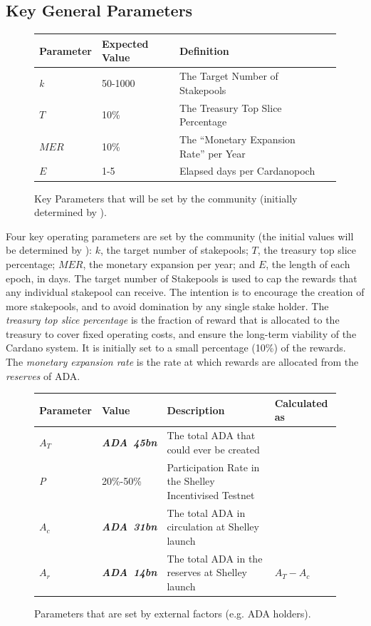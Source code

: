 \documentclass[11pt,a4paper,dvipsnames,twosided]{article}
\newcommand{\ada}{ADA{}}
\newcommand{\ADA}[1]{\textbf{\emph{\ada~{#1}}}}
\newcommand{\cardano}[1]{Cardano}
\begin{document}
\newpage
\subsection{Key General Parameters}

\begin{figure}[h!]
\begin{center}
\begin{tabular}{||l|l|p{6cm}|l||}
  \hline \hline
\textbf{Parameter} & \textbf{Expected Value} & \textbf{Definition} \\\hline
\emph{k} & 50-1000 & The Target Number of Stakepools \\\hline
$T$ & 10\% & The Treasury Top Slice Percentage \\\hline
$MER$ & 10\% &  The ``Monetary Expansion Rate'' per Year \\\hline
$E$ & 1-5 &  Elapsed days per \cardano Epoch \\\hline
\end{tabular}
\end{center}
\caption{Key Parameters that will be set by the community (initially determined by \IOHK).}
\end{figure}

\noindent
Four key operating parameters are set by the community (the initial values will be determined by \IOHK):
$k$, the target number of stakepools;
$T$, the treasury top slice percentage;
$MER$, the monetary expansion per year;
and
$E$, the length of each epoch, in days.
%
The target number of Stakepools is used to cap the rewards that any individual stakepool can receive. The intention is to encourage the creation of more stakepools, and to avoid domination by any single stake holder.
The \emph{treasury top slice percentage} is the fraction of reward that is allocated to the treasury to cover fixed operating costs, and
ensure the long-term viability of the \cardano{} system.  It is initially set to a small percentage (10\%) of the rewards.
The \emph{monetary expansion rate} is the rate at which rewards are allocated from the \emph{reserves} of \ada{}.

\begin{figure}[h!]
\begin{center}
\begin{tabular}{||l|l|p{6cm}|l||}
  \hline \hline
\textbf{Parameter} & \textbf{Value} & \textbf{Description} & \textbf{Calculated as} \\\hline
$A_T$ & \ADA{45bn} & The total \ada{} that could ever be created & \\\hline
\emph{P} & 20\%-50\% & Participation Rate in the Shelley Incentivised Testnet & \\\hline
$A_c$ & \ADA{31bn} & The total \ada{} in circulation at Shelley launch & \\\hline
$A_r$ & \ADA{14bn} & The total \ada{} in the reserves at Shelley launch & $A_T - A_c$ \\\hline
\hline
\end{tabular}
\end{center}
\caption{Parameters that are set by external factors (e.g. \ada{} holders).}
\end{figure}
\end{document}
